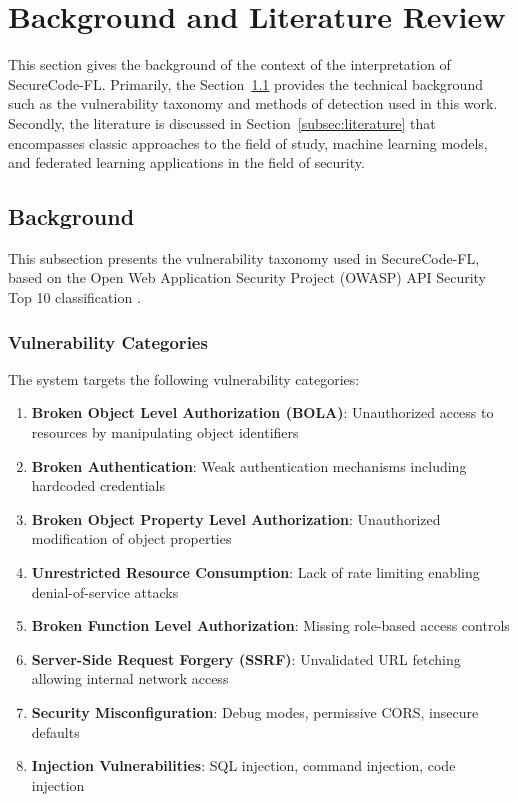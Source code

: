 \documentclass[pdflatex,sn-mathphys-num]{sn-jnl}
\theoremstyle{thmstyleone}%
\theoremstyle{thmstyletwo}%
\theoremstyle{thmstylethree}%
\begin{document}
\section{Background and Literature Review}\label{sec:background}

This section gives the background of the context of the interpretation of SecureCode-FL. Primarily, the Section~\ref{subsec:background} provides the technical background such as the vulnerability taxonomy and methods of detection used in this work. Secondly, the literature is discussed in Section~\ref{subsec:literature} that encompasses classic approaches to the field of study, machine learning models, and federated learning applications in the field of security.

\subsection{Background}\label{subsec:background}

This subsection presents the vulnerability taxonomy used in SecureCode-FL, based on the Open Web Application Security Project (OWASP) API Security Top 10 classification \cite{owasp2023}.

\subsubsection{Vulnerability Categories}\label{subsubsec:categories}

The system targets the following vulnerability categories:

\begin{enumerate}
    \item \textbf{Broken Object Level Authorization (BOLA)}: Unauthorized access to resources by manipulating object identifiers
    \item \textbf{Broken Authentication}: Weak authentication mechanisms including hardcoded credentials
    \item \textbf{Broken Object Property Level Authorization}: Unauthorized modification of object properties
    \item \textbf{Unrestricted Resource Consumption}: Lack of rate limiting enabling denial-of-service attacks
    \item \textbf{Broken Function Level Authorization}: Missing role-based access controls
    \item \textbf{Server-Side Request Forgery (SSRF)}: Unvalidated URL fetching allowing internal network access
    \item \textbf{Security Misconfiguration}: Debug modes, permissive CORS, insecure defaults
    \item \textbf{Injection Vulnerabilities}: SQL injection, command injection, code injection
\end{enumerate}
\end{document}
